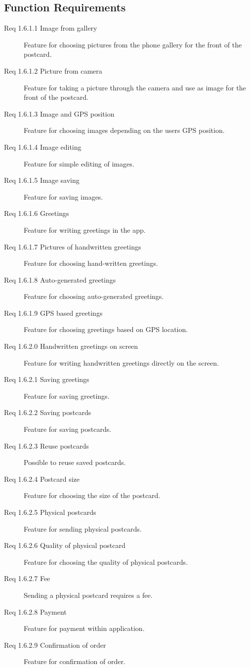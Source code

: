 \documentclass[10pt,a4paper]{article}
\begin{document}
\subsection{Function Requirements}
\begin {description}
\item [Req 1.6.1.1 Image from gallery] Feature for choosing pictures from the phone gallery for the front of the postcard.
\item [Req 1.6.1.2 Picture from camera] Feature for taking a picture through the camera and use as image for the front of the postcard.
\item [Req 1.6.1.3 Image and GPS position] Feature for choosing images depending on the users GPS position.
\item [Req 1.6.1.4 Image editing] Feature for simple editing of images.
\item [Req 1.6.1.5 Image saving] Feature for saving images.
\item [Req 1.6.1.6 Greetings] Feature for writing greetings in the app.
\item [Req 1.6.1.7 Pictures of handwritten greetings] Feature for choosing hand-written greetings.
\item [Req 1.6.1.8 Auto-generated greetings] Feature for choosing auto-generated greetings.
\item [Req 1.6.1.9 GPS based greetings] Feature for choosing greetings based on GPS location.
\item [Req 1.6.2.0 Handwritten greetings on screen] Feature for writing handwritten greetings directly on the screen.
\item [Req 1.6.2.1 Saving greetings] Feature for saving greetings.
\item [Req 1.6.2.2 Saving postcards] Feature for saving postcards.
\item [Req 1.6.2.3 Reuse postcards] Possible to reuse saved postcards.
\item [Req 1.6.2.4 Postcard size] Feature for choosing the size of the postcard.
\item [Req 1.6.2.5 Physical postcards] Feature for sending physical postcards.
\item [Req 1.6.2.6 Quality of physical postcard] Feature for choosing the quality of physical postcards. 
\item [Req 1.6.2.7 Fee] Sending a physical postcard requires a fee.
\item [Req 1.6.2.8 Payment] Feature for payment within application.
\item [Req 1.6.2.9 Confirmation of order] Feature for confirmation of order.

\end{description}
\end{document}
